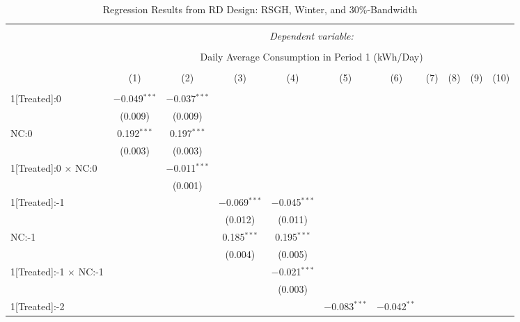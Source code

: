 \begin{table}[!htbp]
\centering 
\caption{Regression Results from RD Design: RSGH, Winter, and 30\%-Bandwidth} 
\label{} 
\footnotesize
\begin{adjustbox}{scale = 0.75}
\begin{tabular}{@{\extracolsep{5pt}}lcccccccccc} 
\\[-1.8ex]\hline 
\hline \\[-1.8ex] 
 & \multicolumn{10}{c}{\textit{Dependent variable:}} \\ 
\cline{2-11} 
\\[-1.8ex] & \multicolumn{10}{c}{Daily Average Consumption in Period 1 (kWh/Day)} \\ 
\\[-1.8ex] & (1) & (2) & (3) & (4) & (5) & (6) & (7) & (8) & (9) & (10)\\ 
\hline \\[-1.8ex] 
 1[Treated]:0 & $-$0.049$^{***}$ & $-$0.037$^{***}$ &  &  &  &  &  &  &  &  \\ 
  & (0.009) & (0.009) &  &  &  &  &  &  &  &  \\ 
 NC:0 & 0.192$^{***}$ & 0.197$^{***}$ &  &  &  &  &  &  &  &  \\ 
  & (0.003) & (0.003) &  &  &  &  &  &  &  &  \\ 
 1[Treated]:0 $\times$ NC:0 &  & $-$0.011$^{***}$ &  &  &  &  &  &  &  &  \\ 
  &  & (0.001) &  &  &  &  &  &  &  &  \\ 
 1[Treated]:-1 &  &  & $-$0.069$^{***}$ & $-$0.045$^{***}$ &  &  &  &  &  &  \\ 
  &  &  & (0.012) & (0.011) &  &  &  &  &  &  \\ 
 NC:-1 &  &  & 0.185$^{***}$ & 0.195$^{***}$ &  &  &  &  &  &  \\ 
  &  &  & (0.004) & (0.005) &  &  &  &  &  &  \\ 
 1[Treated]:-1 $\times$ NC:-1 &  &  &  & $-$0.021$^{***}$ &  &  &  &  &  &  \\ 
  &  &  &  & (0.003) &  &  &  &  &  &  \\ 
 1[Treated]:-2 &  &  &  &  & $-$0.083$^{***}$ & $-$0.042$^{**}$ &  &  &  &  \\ 

\end{tabular}
\end{adjustbox}
\end{table}
